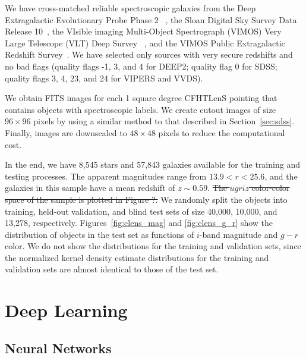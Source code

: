 \documentclass[fleqn,usenatbib]{mnras}
\begin{document}
We have cross-matched reliable spectroscopic galaxies from
the Deep Extragalactic Evolutionary Probe Phase 2~
\citep[DEEP2;][]{davis2003science,newman2013deep2},
the Sloan Digital Sky Survey Data Release 10~\citep[SDSS-DR10]{alam2015eleventh},
the VIsible imaging Multi-Object Spectrograph (VIMOS)
Very Large Telescope (VLT) Deep Survey~
\citep[VVDS;][]{le2005vimos,garilli2008vimos}, and
the VIMOS Public Extragalactic Redshift
Survey~\citep[VIPERS;][]{garilli2014vimos}.
We have selected only sources with very secure
redshifts and no bad flags (quality flags -1, 3, and 4 for DEEP2;
quality flag 0 for SDSS; quality flags 3, 4, 23, and 24 for VIPERS
and VVDS).

We obtain FITS images for each 1 square degree CFHTLenS pointing
that contains objects with spectroscopic labels.
We create cutout images of size $96\times96$ pixels by using a similar method
to that described in Section~\ref{sec:sdss}.
Finally, images are downscaled to $48\times48$ pixels
to reduce the computational cost.

In the end, we have 8,545 stars and 57,843 galaxies available
for the training and testing processes.
The apparent magnitudes range from $13.9 < r < 25.6$,
and the galaxies in this sample have a mean redshift of $z \sim 0.59$.
\sout{ The $ugriz$ color-color space of the sample is plotted in Figure ?.}
We randomly split the objects into training, held-out validation, and
blind test sets of size 40,000, 10,000, and 13,278, respectively.
Figures~\ref{fig:clens_mag} and \ref{fig:clens_g_r} show the distribution
of objects in the test set as functions of $i$-band magnitude and $g-r$ color.
We do not show the distributions for the training and validation sets,
since the normalized kernel density estimate distributions for the training
and validation sets are almost identical to those of the test set.

\section{Deep Learning}
  \label{sec:deep_learning}

\subsection{Neural Networks}
\end{document}
